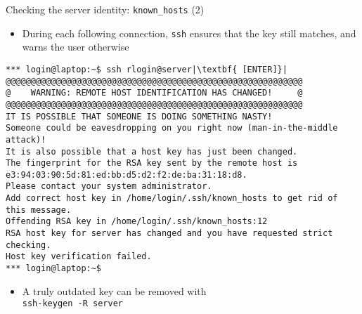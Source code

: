 \documentclass[11pt,final,usepdftitle=false]{beamer}
\begin{document}
\begin{frame}[fragile]{Checking the server identity: \texttt{known\_hosts} (2)}
\begin{itemize}
\item During each following connection, \texttt{ssh} ensures that the key still matches, and warns the user otherwise
\end{itemize}
\begin{lstlisting}[basicstyle=\ttfamily\ssmall,escapeinside={||}]
*** login@laptop:~$ ssh rlogin@server|\textbf{ [ENTER]}|
@@@@@@@@@@@@@@@@@@@@@@@@@@@@@@@@@@@@@@@@@@@@@@@@@@@@@@@@@@@
@    WARNING: REMOTE HOST IDENTIFICATION HAS CHANGED!     @
@@@@@@@@@@@@@@@@@@@@@@@@@@@@@@@@@@@@@@@@@@@@@@@@@@@@@@@@@@@
IT IS POSSIBLE THAT SOMEONE IS DOING SOMETHING NASTY!
Someone could be eavesdropping on you right now (man-in-the-middle attack)!
It is also possible that a host key has just been changed.
The fingerprint for the RSA key sent by the remote host is
e3:94:03:90:5d:81:ed:bb:d5:d2:f2:de:ba:31:18:d8.
Please contact your system administrator.
Add correct host key in /home/login/.ssh/known_hosts to get rid of this message.
Offending RSA key in /home/login/.ssh/known_hosts:12
RSA host key for server has changed and you have requested strict checking.
Host key verification failed.
*** login@laptop:~$ 
\end{lstlisting}
\begin{itemize}
	\item A truly outdated key can be removed with\\ \texttt{ssh-keygen -R server}
\end{itemize}
\end{frame}
\end{document}
